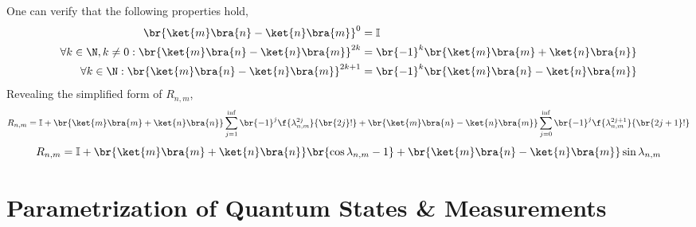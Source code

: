 \documentclass[aps, 10pt, english, twoside, pra, longbibliography]{revtex4-1}
\theoremstyle{plain}
\theoremstyle{definition}
\theoremstyle{remark}
\begin{document}
    One can verify that the following properties hold,
    \begin{align*}
        \br{\ket{m}\bra{n} - \ket{n}\bra{m}}^0 &= \mathbb{I} \\
        \forall k \in \N, k \neq 0 : \br{\ket{m}\bra{n} - \ket{n}\bra{m}}^{2k} &= \br{-1}^k\br{\ket{m}\bra{m} + \ket{n}\bra{n}} \\
        \forall k \in \N : \br{\ket{m}\bra{n} - \ket{n}\bra{m}}^{2k+1} &= \br{-1}^k\br{\ket{m}\bra{n} - \ket{n}\bra{m}}
    \end{align*}
    Revealing the simplified form of $R_{n,m}$,
    \[ R_{n,m} = \mathbb{I} + \br{\ket{m}\bra{m} + \ket{n}\bra{n}} \sum_{j=1}^{\inf} \br{-1}^j\f{\lambda_{n,m}^{2j}}{\br{2j}!} + \br{\ket{m}\bra{n} - \ket{n}\bra{m}} \sum_{j=0}^{\inf} \br{-1}^j\f{\lambda_{n,m}^{2j+1}}{\br{2j+1}!} \]
    \[ R_{n,m} = \mathbb{I} + \br{\ket{m}\bra{m} + \ket{n}\bra{n}} \br{\cos\lambda_{n,m} - 1} + \br{\ket{m}\bra{n} - \ket{n}\bra{m}} \sin\lambda_{n,m} \]

    \section{Parametrization of Quantum States \& Measurements}

    
\end{document}
